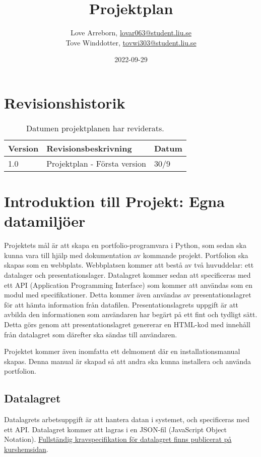 \documentclass{TDP003mall}
\author{Love Arreborn, \url{lovar063@student.liu.se}\\
  Tove Winddotter, \url{tovwi303@student.liu.se}}
\title{Projektplan}
\date{2022-09-29}
\begin{document}
\projectpage
\pagebreak
\tableofcontents

\pagebreak

\section*{Revisionshistorik}
%
\begin{table}[h]
\begin{tabularx}{\textwidth}{|l|X|l|}
\hline
Version & Revisionsbeskrivning                         & Datum \\ \hline
1.0     & Projektplan - Första version                 & 30/9  \\ \hline
\end{tabularx}
\centering
    \caption{\label{tab:table-name}Datumen projektplanen har reviderats.}
  \end{table}

\pagebreak

\section*{Introduktion till Projekt: Egna datamiljöer}
%

Projektets mål är att skapa en portfolio-programvara i Python, som sedan ska kunna vara till hjälp med dokumentation av kommande projekt. Portfolion ska skapas som en webbplats. Webbplatsen kommer att bestå av två huvuddelar: ett datalager och presentationslager. Datalagret kommer sedan att specificeras med ett API (Application Programming Interface) som kommer att användas som en modul med specifikationer. Detta kommer även användas av presentationslagret för att hämta information från datafilen. Presentationslagrets uppgift är att avbilda den informationen som användaren har begärt på ett fint och tydligt sätt. Detta görs genom att presentationslagret genererar en HTML-kod med innehåll från datalagret som därefter ska sändas till användaren.

Projektet kommer även inomfatta ett delmoment där en installationsmanual skapas. Denna manual är skapad så att andra ska kunna installera och använda portfolion.

\subsection*{Datalagret}
%
Datalagrets arbetsuppgift är att hantera datan i systemet, och specificeras med ett API. Datalagret kommer att lagras i en JSON-fil (JavaScript Object Notation). \href{https://www.ida.liu.se/~TDP003/current/portfolio-api_python3/}{Fullständig kravspecifikation för datalagret finns publicerat på kurshemsidan}.
\end{document}
